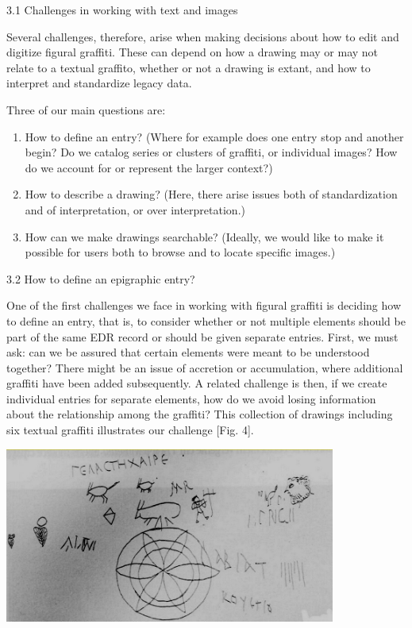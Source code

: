 \documentclass[amsthm,ebook]{saparticle}
\begin{document}
3.1 Challenges in working with text and images

Several challenges, therefore, arise when making decisions about how to edit and digitize figural graffiti. These can
depend on how a drawing may or may not relate to a textual graffito, whether or not a drawing is extant, and how to
interpret and standardize legacy data. 


\bigskip

Three of our main questions are:

\begin{enumerate}
\item How to define an entry? (Where for example does one entry stop and another begin? Do we catalog series or clusters
of graffiti, or individual images? How do we account for or represent the larger context?)
\item How to describe a drawing? (Here, there arise issues both of standardization and of interpretation, or over
interpretation.)
\item How can we make drawings searchable? (Ideally, we would like to make it possible for users both to browse and to
locate specific images.)
\end{enumerate}

\bigskip

3.2 How to define an epigraphic entry? 

One of the first challenges we face in working with figural graffiti is deciding how to define an entry, that is, to
consider whether or not multiple elements should be part of the same EDR record or should be given separate entries.
First, we must ask: can we be assured that certain elements were meant to be understood together? There might be an
issue of accretion or accumulation, where additional graffiti have been added subsequently. A related challenge is
then, if we create individual entries for separate elements, how do we avoid losing information about the relationship
among the graffiti? This collection of drawings including six textual graffiti illustrates our challenge [Fig. 4].

 \includegraphics[width=10.88cm,height=5.761cm]{EAGLE2016BenefielSypniewski-img004.jpg} 
\end{document}
